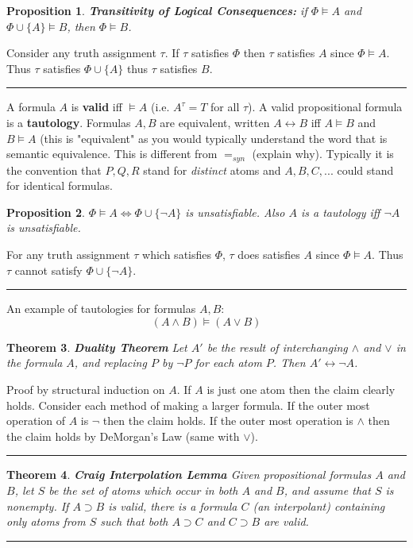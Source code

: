 \documentclass[twoside]{article}
\newcounter{lecnum}
\newtheorem{theorem}{Theorem}[lecnum]
\newtheorem{proposition}[theorem]{Proposition}
\newenvironment{proof}{{\bf Proof:}}{\hfill\rule{2mm}{2mm}}
\begin{document}
\begin{proposition}
\textbf{Transitivity of Logical Consequences:} if $\Phi \vDash A$ and $\Phi \cup \{A\} \vDash B$, then $\Phi \vDash B$. 
\end{proposition}
\begin{proof}
Consider any truth assignment $\tau$. If $\tau$ satisfies $\Phi$ then $\tau$ satisfies $A$ since $\Phi \vDash A$. Thus $\tau$ satisfies $\Phi \cup \{A\}$ thus $\tau$ satisfies $B$. 
\end{proof}

A formula $A$ is \textbf{valid} iff $\vDash A$ (i.e. $A^{\tau} = T$ for all $\tau$). A valid propositional formula is a \textbf{tautology}. Formulas $A, B$ are equivalent, written $A \longleftrightarrow B$ iff $A \vDash B$ and $B \vDash A$ (this is "equivalent" as you would typically understand the word that is semantic equivalence. This is different from $=_{syn}$ (explain why). Typically it is the convention that $P, Q, R$ stand for \emph{distinct} atoms and $A, B, C,...$ could stand for identical formulas. 

\begin{proposition}
$\Phi \vDash A \iff \Phi \cup \{\lnot A\}$ is unsatisfiable. Also $A$ is a tautology iff $\lnot A$ is unsatisfiable. 
\end{proposition}
\begin{proof}
For any truth assignment $\tau$ which satisfies $\Phi$, $\tau$ does satisfies $A$ since $\Phi \vDash A$. Thus $\tau$ cannot satisfy $\Phi \cup \{\lnot A\}$. 
\end{proof}

An example of tautologies for formulas $A, B$:
\[(A \land B) \vDash (A \lor B)\]

\begin{theorem}
\textbf{Duality Theorem} Let $A'$ be the result of interchanging $\land$ and $\lor$ in the formula $A$, and replacing $P$ by $\lnot P$ for each atom $P$. Then $A' \longleftrightarrow \lnot A$.
\end{theorem}
\begin{proof}
Proof by structural induction on $A$. If $A$ is just one atom then the claim clearly holds. Consider each method of making a larger formula. If the outer most operation of $A$ is $\lnot$ then the claim holds. If the outer most operation is $\land$ then the claim holds by DeMorgan's Law (same with $\lor$).
\end{proof}

\begin{theorem}
\textbf{Craig Interpolation Lemma} Given propositional formulas $A$ and $B$, let $S$ be the set of atoms which occur in both $A$ and $B$, and assume that $S$ is nonempty. If $A \supset B$ is valid, there is a formula $C$ (an \emph{interpolant}) containing only atoms from $S$ such that both $A \supset C$ and $C \supset B$ are valid. 
\end{theorem}
\begin{proof}

\end{proof}
\end{document}
